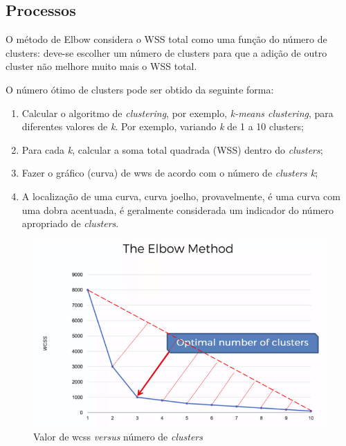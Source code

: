 \documentclass[12pt, a4paper, oneside]{scrreport}
\begin{document}
\subsection{Processos}
\quad O método de Elbow considera o WSS total como uma função do número de clusters: deve-se escolher um número de clusters para que a adição de outro cluster não melhore muito mais o WSS total.\par
O número ótimo de clusters pode ser obtido da seguinte forma:\par
\begin{enumerate}[leftmargin=2cm, align=left]
\item	Calcular o algoritmo de \textit{clustering}, por exemplo, \textit{k-means clustering}, para diferentes valores de \textit{k}. Por exemplo, variando \textit{k} de 1 a 10 clusters;\par
\item	Para cada \textit{k}, calcular a soma total quadrada (WSS) dentro do \textit{clusters};\par
\item	Fazer o gráfico (curva) de wws de acordo com o número de \textit{clusters k};\par
\item	A localização de uma curva, curva joelho, provavelmente, é uma curva com uma dobra acentuada, é geralmente considerada um indicador do número apropriado de \textit{clusters}.\par
\end{enumerate}
 
\begin{figure}[h!]
  \centering
  \includegraphics[scale=0.4]{3.png}
  \caption{Valor de wcss \textit{versus} número de \textit{clusters}}   
  \label{fig:picture}
\end{figure}
\end{document}
